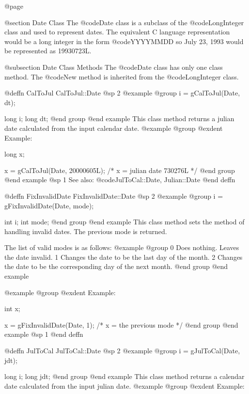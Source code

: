 @page

@section Date Class
The @code{Date} class is a subclass of the @code{LongInteger}
class and used to represent dates.  The equivalent C language
representation would be a long integer in the form @code{YYYYMMDD}
so July 23, 1993 would be represented as 19930723L.





@subsection Date Class Methods
The @code{Date} class has only one class method.  The @code{New}
method is inherited from the @code{LongInteger} class.






@deffn {CalToJul} CalToJul::Date
@sp 2
@example
@group
i = gCalToJul(Date, dt);

long  i;
long  dt;
@end group
@end example
This class method returns a julian date calculated from the
input calendar date.
@example
@group
@exdent Example:

long  x;

x = gCalToJul(Date, 20000605L);  /* x = julian date 730276L */
@end group
@end example
@sp 1
See also:  @code{JulToCal::Date, Julian::Date}
@end deffn






@deffn {FixInvalidDate} FixInvalidDate::Date
@sp 2
@example
@group
i = gFixInvalidDate(Date, mode);

int  i;
int  mode;
@end group
@end example
This class method sets the method of handling invalid dates.  The
previous mode is returned.

The list of valid modes is as follows:
@example
@group
0   Does nothing.  Leaves the date invalid.
1   Changes the date to be the last day of the month.
2   Changes the date to be the corresponding day of the
    next month.
@end group
@end example

@example
@group
@exdent Example:

int  x;

x = gFixInvalidDate(Date, 1);   /*  x = the previous mode */
@end group
@end example
@sp 1
@end deffn






@deffn {JulToCal} JulToCal::Date
@sp 2
@example
@group
i = gJulToCal(Date, jdt);

long  i;
long  jdt;
@end group
@end example
This class method returns a calendar date calculated from the
input julian date.
@example
@group
@exdent Example:

